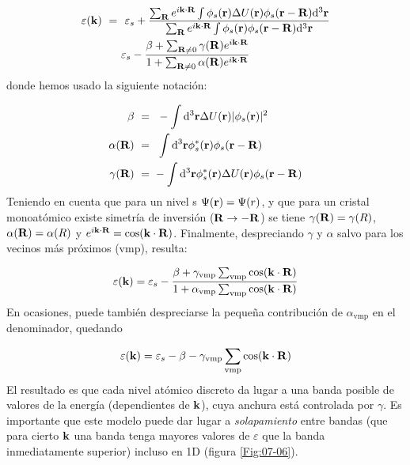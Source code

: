 \begin{equation}
	\begin{split}
		\varepsilon (\mathbf{k}) \ = \ & \ \varepsilon_s  + \frac{\sum_{\mathbf{R}} e^{i \mathbf{k} \cdot \mathbf{R} }\int \phi_s (\mathbf{r}) \Delta U (\mathbf{r}) \phi_s (\mathbf{r} - \mathbf{R}) \mathrm{d}^3 \mathbf{r} }{\sum_{\mathbf{R}} e^{i \mathbf{k} \cdot \mathbf{R} }\int \phi_s (\mathbf{r})\phi_s (\mathbf{r} - \mathbf{R}) \mathrm{d}^3 \mathbf{r} }\\
		& \varepsilon_s -  \frac{\beta + \sum_{\mathbf{R}\neq 0} \gamma(\mathbf{R}) e^{i\mathbf{k} \cdot \mathbf{R}}}{1+\sum_{\mathbf{R}\neq 0} \alpha (\mathbf{R}) e^{i\mathbf{k} \cdot \mathbf{R}}}
	\end{split}
\end{equation}
donde hemos usado la siguiente notación: 

\begin{equation}
	\begin{split}
		\beta \ = \ &  \ - \int   \mathrm{d}^3 \mathbf{r} \Delta U (\mathbf{r}) |\phi_s (\mathbf{r}) |^2 \\
		\alpha (\mathbf{R}) \ = \ & \ \int \mathrm{d}^3\mathbf{r} \phi_s^* (\mathbf{r}) \phi_s (\mathbf{r}-\mathbf{R}) \\
		\gamma (\mathbf{R}) \ = \ & - \int \mathrm{d}^3 \mathbf{r} \phi_s^* (\mathbf{r}) \Delta U (\mathbf{r}) \phi_s (\mathbf{r} - \mathbf{R})
	\end{split}
\end{equation}
Teniendo en cuenta que para un nivel s $\Psi (\mathbf{r}) = \Psi (r)$, y que para un cristal monoatómico existe simetría de inversión ($\mathbf{R} \rightarrow - \mathbf{R}$) se tiene $\gamma (\mathbf{R}) = \gamma (R)$, $\alpha (\mathbf{R}) = \alpha (R)$ y $e^{i \mathbf{k} \cdot \mathbf{R}} = \cos (\mathbf{k} \cdot \mathbf{R})$. Finalmente, despreciando $\gamma$ y $\alpha$ salvo para los vecinos más próximos (vmp), resulta:

\begin{equation}
	\varepsilon(\mathbf{k}) = \varepsilon_s - \frac{\beta + \gamma_{\text{vmp}} \sum_{\text{vmp}} \cos (\mathbf{k} \cdot \mathbf{R})}{1+\alpha_{\text{vmp}} \sum_{\text{vmp}} \cos (\mathbf{k} \cdot \mathbf{R})}
\end{equation}
En ocasiones, puede también despreciarse la pequeña contribución de $\alpha_{\text{vmp}}$ en el denominador, quedando

\begin{equation}
	\varepsilon(\mathbf{k}) = \varepsilon_s - \beta - \gamma_{\text{vmp}} \sum_{\text{vmp}} \cos (\mathbf{k}\cdot \mathbf{R})
\end{equation}
El resultado es que cada nivel atómico discreto da lugar a una banda posible de valores de la energía (dependientes de $\mathbf{k}$), cuya anchura está controlada por $\gamma$. Es importante que este modelo puede dar lugar a \textit{solapamiento} entre bandas (que para cierto $\mathbf{k}$ una banda tenga mayores valores de $\varepsilon$ que la banda inmediatamente superior) incluso en 1D (figura \ref{Fig:07-06}). 


